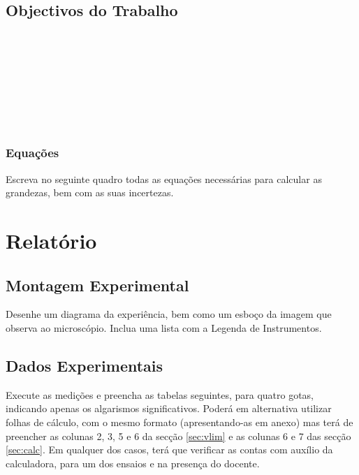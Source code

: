 \documentclass[a4paper,12pt]{article}  %
\begin{document}
\subsection{\sf Objectivos do Trabalho}
\noindent\underline{\makebox[\textwidth][r]{~}} \\
\noindent\underline{\makebox[\textwidth][r]{~}} \\
\noindent\underline{\makebox[\textwidth][r]{~}} \\
\noindent\underline{\makebox[\textwidth][r]{~}} \\
\noindent\underline{\makebox[\textwidth][r]{~}} \\
\noindent\underline{\makebox[\textwidth][r]{~}} \\
\noindent\underline{\makebox[\textwidth][r]{~}} \\

\subsubsection{\sf Equações }
Escreva no seguinte quadro todas as equações necessárias para calcular as grandezas, bem com as suas incertezas.
\begin{center}
\framebox[15cm]{\rule{0pt}{9.5cm}}
\end{center}


\section{\sf Relatório}
\subsection{\sf Montagem Experimental}
Desenhe um diagrama da experiência, bem como um esboço da imagem que observa ao microscópio. Inclua uma lista com a Legenda de Instrumentos.
\begin{center}
\framebox[18cm]{\rule{0pt}{6.5cm}}
\end{center}

\subsection{\sf Dados Experimentais}\label{sec:dados}
Execute as medições e preencha as tabelas seguintes, para quatro gotas, indicando  apenas os algarismos significativos. Poderá em alternativa utilizar folhas de cálculo, com o mesmo formato (apresentando-as em anexo) mas terá de preencher as colunas 2, 3, 5 e 6 da secção \ref{sec:vlim} e as colunas 6 e 7 das secção \ref{sec:calc}. Em qualquer dos casos, terá que verificar as contas com auxílio da calculadora, para um dos ensaios e na presença do docente.
\end{document}
